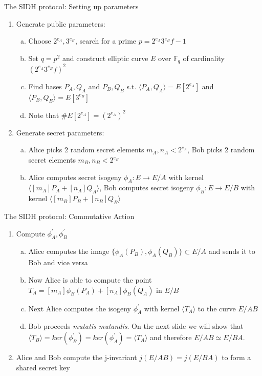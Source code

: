 \documentclass[handout]{beamer}
\begin{document}
\begin{frame}{The SIDH protocol: Setting up parameters}
\begin{enumerate}[1.]
	\item Generate public parameters:
	\begin{enumerate}[(a)]
		\item Choose $2^{e_A},3^{e_B}$, search for a prime $p=2^{e_A}3^{e_B}f- 1$\pause %
		\item Set $q=p^2$ and construct elliptic curve $E$ over $\mathbb{F}_q$ of cardinality $(2^{e_A}3^{e_B}f)^2$\pause %
		\item Find bases $P_A,Q_A$ and $P_B,Q_B$ s.t. $\langle P_A,Q_A\rangle = E[2^{e_A}]$ and $\langle P_B,Q_B\rangle = E[3^{e_B}]$ \pause  %
		\item Note that $\#E[2^{e_A}] =(2^{e_A})^2$
	\end{enumerate}
	\item Generate secret parameters:
	\begin{enumerate}[(a)]
		\item Alice picks 2 random secret elements $m_A,n_A < 2^{e_A}$, Bob picks 2 random secret elements $m_B,n_B < 2^{e_B}$\pause
		\item Alice computes secret isogeny $\phi_A : E \to E/A$ with kernel $\langle [m_A]P_A+[n_A]Q_A\rangle$, Bob computes secret isogeny $\phi_B : E \to E/B$ with kernel $\langle [m_B]P_B+[n_B]Q_B\rangle$
	\end{enumerate}

\end{enumerate}
\end{frame}

\begin{frame}{The SIDH protocol: Commutative Action}

\begin{enumerate}[1.]
	\item Compute $\phi_A^{\prime},\phi_B^{\prime}$

	\begin{enumerate}[(a)]
		\item Alice computes the image $\{\phi_A(P_B),\phi_A(Q_B)\} \subset E/A$ and sends it to Bob and vice versa\pause
		\item Now Alice is able to compute the point $T_A=[m_A]\phi_B(P_A) + [n_A]\phi_B(Q_A)$ in $E/B$\pause
		\item Next Alice computes the isogeny $\phi_A^{\prime}$ with kernel $\langle T_A \rangle$ to the curve $E/AB$\pause
		\item Bob proceeds \textit{mutatis mutandis}. On the next slide we will show that $\langle T_B \rangle  = ker(\phi_B^{\prime})=ker(\phi_A^{\prime})=\langle T_A \rangle$ and therefore $E/AB \simeq E/BA$.
	\end{enumerate}
	\item Alice and Bob compute the j-invariant $j(E/AB)=j(E/BA)$ to form a shared secret key 
\end{enumerate}
\end{frame}
\end{document}
